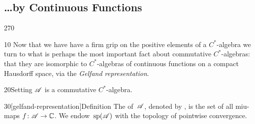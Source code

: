 \subsection{\dots by Continuous Functions}
\begin{parsec}{270}%
\begin{point}{10}%
Now that we have have a firm grip
on the positive elements of a $C^*$-algebra
we turn to what is perhaps the most important
fact about commutative $C^*$-algebras:
that they are isomorphic to $C^*$-algebras
of continuous functions on a compact Hausdorff space,
via the \emph{Gelfand representation}.
\end{point}
\begin{point}{20}{Setting}%
$\mathscr{A}$ is a commutative $C^*$-algebra.
\end{point}
\begin{point}{30}[gelfand-representation]{Definition}%
The  of~$\mathscr{A}$,%
denoted by \Define{$\spec(\scrA)$},
is the set of all miu-maps $f\colon \mathscr{A}\to \mathbb{C}$.
We endow~$\spec(\scrA)$
with the topology of pointwise convergence.


\end{point}
\end{parsec}
